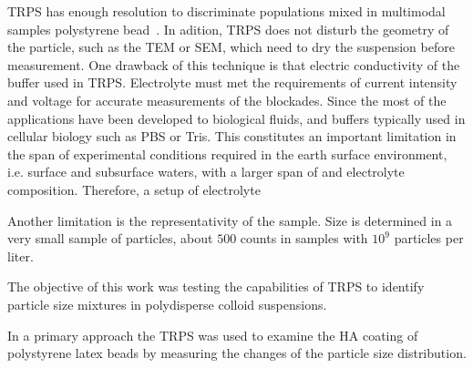 \documentclass[journal=langd5,manuscript=article]{achemso}
\begin{document}
TRPS has enough resolution to discriminate populations mixed in multimodal
samples polystyrene bead~\cite{Varenne2016MultimodalMethods}. 
In adition, TRPS does not disturb the geometry of the particle, such as  the
TEM or SEM, which need to dry the suspension before measurement.
One drawback of this technique is that electric conductivity of the buffer
used in TRPS.
Electrolyte must met the requirements of current intensity and
voltage for accurate measurements of the blockades.
Since the most of the applications have been developed to 
biological fluids, and buffers typically used in cellular biology  such as PBS or Tris.
This constitutes an
important limitation in the span of  experimental conditions  required in the  earth surface environment, i.e. surface and subsurface waters, with a larger  span of  and electrolyte composition.
Therefore, a setup of electrolyte 


%
Another limitation is the representativity of the sample. Size is determined in a very small sample of particles, about  $500$ counts in samples with $10^9$ particles per liter.




The objective of this work was testing the capabilities of TRPS to identify
particle size mixtures in  polydisperse colloid suspensions.

In a primary approach the TRPS was used to examine the HA coating of
polystyrene latex beads by measuring the changes of the particle size
distribution.




\end{document}

